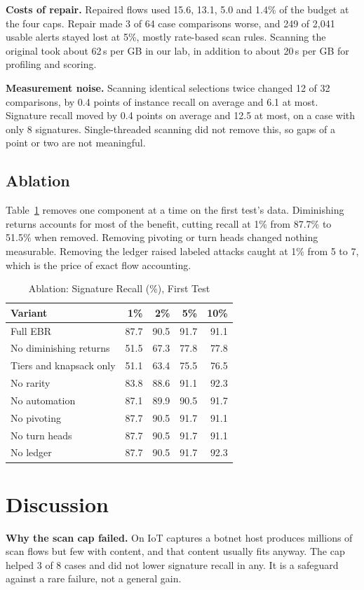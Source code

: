 \documentclass[conference]{IEEEtran}
\begin{document}
\textbf{Costs of repair.} Repaired flows used 15.6, 13.1, 5.0 and 1.4\% of the budget at the four caps. Repair made 3 of 64 case comparisons worse, and 249 of 2,041 usable alerts stayed lost at 5\%, mostly rate-based scan rules. Scanning the original took about 62\,s per GB in our lab, in addition to about 20\,s per GB for profiling and scoring.

\textbf{Measurement noise.} Scanning identical selections twice changed 12 of 32 comparisons, by 0.4 points of instance recall on average and 6.1 at most. Signature recall moved by 0.4 points on average and 12.5 at most, on a case with only 8 signatures. Single-threaded scanning did not remove this, so gaps of a point or two are not meaningful.

\subsection{Ablation}
Table~\ref{tab:abl} removes one component at a time on the first test's data. Diminishing returns accounts for most of the benefit, cutting recall at 1\% from 87.7\% to 51.5\% when removed. Removing pivoting or turn heads changed nothing measurable. Removing the ledger raised labeled attacks caught at 1\% from 5 to 7, which is the price of exact flow accounting.

\begin{table}[t]
\centering
\caption{Ablation: Signature Recall (\%), First Test}
\label{tab:abl}
\footnotesize
\begin{tabular}{@{}lrrrr@{}}
\toprule
Variant & 1\% & 2\% & 5\% & 10\%\\
\midrule
Full EBR & 87.7 & 90.5 & 91.7 & 91.1\\
No diminishing returns & 51.5 & 67.3 & 77.8 & 77.8\\
Tiers and knapsack only & 51.1 & 63.4 & 75.5 & 76.5\\
No rarity & 83.8 & 88.6 & 91.1 & 92.3\\
No automation & 87.1 & 89.9 & 90.5 & 91.7\\
No pivoting & 87.7 & 90.5 & 91.7 & 91.1\\
No turn heads & 87.7 & 90.5 & 91.7 & 91.1\\
No ledger & 87.7 & 90.5 & 91.7 & 92.3\\
\bottomrule
\end{tabular}
\end{table}

\section{Discussion}
\textbf{Why the scan cap failed.} On IoT captures a botnet host produces millions of scan flows but few with content, and that content usually fits anyway. The cap helped 3 of 8 cases and did not lower signature recall in any. It is a safeguard against a rare failure, not a general gain.
\end{document}
